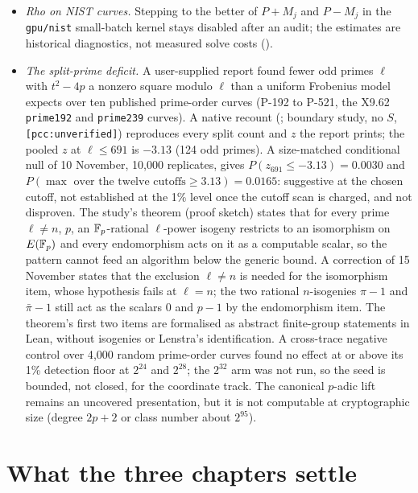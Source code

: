 \begin{itemize}
\item \emph{Rho on NIST curves.} Stepping to the better of $P+M_j$ and
  $P-M_j$ in the \texttt{gpu/nist} small-batch kernel stays disabled after an
  audit; the estimates are historical diagnostics, not measured solve costs
  ().
\item \emph{The split-prime deficit.} A user-supplied report found fewer
  odd primes $\ell$ with $t^2-4p$ a nonzero square modulo $\ell$ than a
  uniform Frobenius model expects over ten
  published prime-order curves (P-192 to P-521, the X9.62 \texttt{prime192}
  and \texttt{prime239} curves). A native recount
  (; boundary study, no
  $S$, \texttt{[pcc:unverified]}) reproduces every split count and $z$ the
  report prints; the pooled $z$ at $\ell\le691$ is $-3.13$ (124 odd
  primes). A size-matched conditional null of 10 November, 10{,}000
  replicates, gives $P(z_{691}\le-3.13)=0.0030$ and
  $P(\max\text{ over the twelve cutoffs}\ge3.13)=0.0165$: suggestive at the
  chosen cutoff, not established at the 1\% level once the cutoff scan is
  charged, and not disproven. The study's theorem (proof sketch) states that
  for every prime $\ell\ne n$, $p$, an $\mathbb{F}_p$-rational $\ell$-power isogeny
  restricts to an isomorphism on $E(\mathbb{F}_p)$ and every endomorphism acts on it
  as a computable scalar, so the pattern cannot feed an algorithm below the
  generic bound. A correction of 15 November states that the exclusion
  $\ell\ne n$ is needed for the isomorphism item, whose hypothesis fails at
  $\ell=n$; the two rational $n$-isogenies $\pi-1$ and $\bar\pi-1$ still act
  as the scalars 0 and $p-1$ by the endomorphism item. The theorem's first
  two items are formalised as abstract finite-group statements in Lean,
  without isogenies or Lenstra's identification. A cross-trace negative
  control over 4{,}000 random prime-order curves found no effect at or above
  its 1\% detection floor at $2^{24}$ and $2^{28}$; the $2^{32}$ arm was not
  run, so the seed is bounded, not closed, for the coordinate track. The
  canonical $p$-adic lift remains an uncovered presentation, but it is not
  computable at cryptographic size (degree $2p+2$ or class number about
  $2^{95}$).
\end{itemize}

\section{What the three chapters settle}\label{sec:pt-summary}

